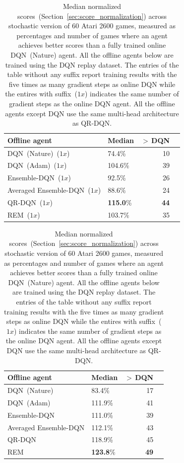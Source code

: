 \begin{table}[h]
    \caption{Median normalized scores~(Section~\ref{sec:score_normalization}) across stochastic version of 60 Atari 2600 games, measured as percentages
    and number of games where an agent achieves better scores than a fully trained online DQN~(Nature) agent. All the offline
    agents below are trained using the DQN replay dataset. The entries of the table without any suffix report training results
    with the five times as many gradient steps as online DQN while the entires with suffix~($1x$) indicates the same number of gradient
    steps as the online DQN agent. All the offline agents except DQN use the same multi-head architecture
    as QR-DQN.}\label{table:perc_scores}
    \centering
    \begin{minipage}{.48\linewidth}
      \centering
      \footnotesize
      \begin{tabular}{llrr}
      \toprule
      Offline agent & Median & $>\,$DQN \\
      \midrule
      DQN~(Nature)~($1x$)           &  74.4\%  & 10 \\
      DQN~(Adam)~($1x$)     & 104.6\% & 39 \\
      Ensemble-DQN~($1x$)  &  92.5\% & 26 \\
      Averaged Ensemble-DQN~($1x$) & 88.6\% & 24 \\
      QR-DQN~($1x$)        &  \textbf{115.0}\% & \textbf{44}  \\
      REM~($1x$)           &  103.7\% & 35  \\
      \bottomrule
      \end{tabular}
    \end{minipage}%
    \begin{minipage}{.48\linewidth}
      \centering
      \footnotesize
      \begin{tabular}{llrr}
      \toprule
      Offline agent & Median & $>\,$DQN \\
      \midrule
      DQN~(Nature)      & 83.4\%  & 17 \\
      DQN~(Adam) & 111.9\% & 41 \\
      Ensemble-DQN & 111.0\% & 39\\
      Averaged Ensemble-DQN & 112.1\% & 43 \\
      QR-DQN     & 118.9\% & 45 \\
      REM      & \textbf{123.8}\%  & \textbf{49} \\
      \bottomrule
      \end{tabular}
    \end{minipage}
\vspace{-0.35cm}
\end{table}


